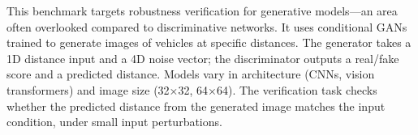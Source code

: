 \documentclass[oneside,11pt,dvipsnames]{book}
\begin{document}
This benchmark targets robustness verification for generative models—an area often overlooked compared to discriminative networks.
It uses conditional GANs trained to generate images of vehicles at specific distances. The generator takes a 1D distance input and a 4D noise vector; the discriminator outputs a real/fake score and a predicted distance.
Models vary in architecture (CNNs, vision transformers) and image size (32×32, 64×64).
The verification task checks whether the predicted distance from the generated image matches the input condition, under small input perturbations.


\end{document}
